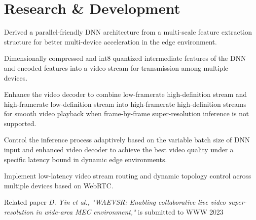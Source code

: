 \documentclass[]{deedy-resume-openfont}
\begin{document}
\begin{minipage}[t]{0.77\textwidth} 


\section{Research \& Development}
\vspace{\topsep}
\begin{tightemize}
    \item Derived a parallel-friendly DNN architecture from a multi-scale feature extraction structure for better multi-device acceleration in the edge environment. %
    \item Dimensionally compressed and int8 quantized intermediate features of the DNN and encoded features into a video stream for transmission among multiple devices. %
    \item Enhance the video decoder to combine low-framerate high-definition stream and high-framerate low-definition stream into high-framerate high-definition streams for smooth video playback when frame-by-frame super-resolution inference is not supported. %
    \item Control the inference process adaptively based on the variable batch size of DNN input and enhanced video decoder to achieve the best video quality under a specific latency bound in dynamic edge environments.
    \item Implement low-latency video stream routing and dynamic topology control across multiple devices based on WebRTC.
    \item Related paper \textit{D. Yin et al., "WAEVSR: Enabling collaborative live video super-resolution in wide-area MEC environment,"} is submitted to WWW 2023
\end{tightemize}
\sectionsep



\end{minipage}
\end{document}

